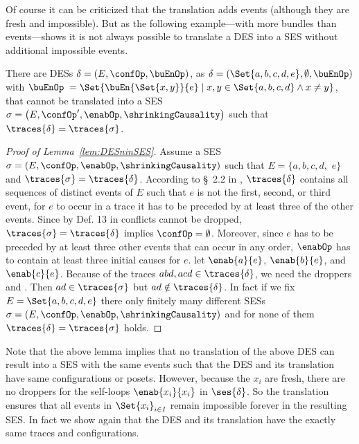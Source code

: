 \documentclass[runningheads,a4paper]{llncs}
\begin{document}
Of course it can be criticized that the translation adds events (although they are fresh and impossible). But as the following example---with more bundles than events---shows it is not always possible to translate a DES into a SES without additional impossible events.

\begin{lemma}
	\label{lem:DESninSES}
	There are DESs $ \delta = \left( E, \confOp, \buEnOp \right) $, as \eg $ \delta = \left( \Set{ a, b, c, d, e }, \emptyset, \buEnOp \right) $ with $ \buEnOp \; = \Set{ \buEn{\Set{ x, y }}{e} \mid x, y \in \Set{ a, b, c, d } \land x \neq y } $,
	that cannot be translated into a SES $ \sigma = \left( E, \confOp', \enabOp, \shrinkingCausality \right) $ such that $ \traces{\delta} = \traces{\sigma} $.
\end{lemma}

\begin{proof}[Proof of Lemma~\ref{lem:DESninSES}]
	Assume a SES $ \sigma = \left( E, \confOp, \enabOp, \shrinkingCausality \right) $ such that $ E = \{ a, b, c, d,$ $ e \} $ and $ \traces{\sigma} = \traces{\delta} $.
	According to \S~2.2 in \cite{dynamicCausality15}, $ \traces{\delta} $ contains all
	sequences of distinct events of $ E $ such that $ e $ is not the first, second, or third event, \ie for $ e $ to occur in a trace it has to be preceded by at least three of the other events.
	Since by Def. 13 in \cite{dynamicCausality15} conflicts cannot be dropped, $ \traces{\sigma} = \traces{\delta} $ implies $ \confOp = \emptyset $.
	Moreover, since $ e $ has to be preceded by at least three other events that can occur in any order, $ \enabOp $ has to contain at least three initial causes for $ e $. \WLOG let $ \enab{a}{e} $, $ \enab{b}{e} $, and $ \enab{c}{e} $.
	Because of the traces $ abd, acd \in \traces{\delta} $, we need the droppers  and . Then $ ad \in \traces{\sigma} $ but $ ad \notin \traces{\delta} $.
	In fact if we fix $ E = \Set{ a, b, c, d, e } $ there only finitely many different SESs $ \sigma = \left( E, \confOp, \enabOp, \shrinkingCausality \right) $ and for none of them $ \traces{\delta} = \traces{\sigma} $ holds.
\end{proof}

Note that the above lemma implies that no translation of the above DES can result into a SES with the same events such that the DES and its translation have same configurations or posets.
However, because the $ x_i $ are fresh, there are no droppers for the self-loops $ \enab{x_i}{x_i} $ in $ \ses{\delta} $. So the translation ensures that all events in $ \Set{ x_i }_{i \in I} $ remain impossible forever in the resulting SES. In fact we show again that the DES and its translation have the exactly same traces and configurations.
\end{document}
